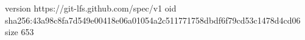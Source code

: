 version https://git-lfs.github.com/spec/v1
oid sha256:43a98c8fa7d549e00418e06a01054a2c511771758dbdf6f79cd53c1478d4cd06
size 653
